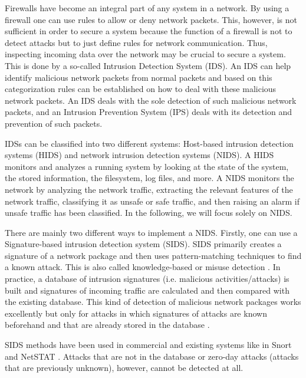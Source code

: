 \documentclass[]{article}
\begin{document}
\noindent
Firewalls have become an integral part of any system in a network. By using a firewall one can use rules to allow or deny network packets. This, however, is not sufficient in order to secure a system because the function of a firewall is not to detect attacks but to just define rules for network communication. Thus, inspecting incoming data over the network may be crucial to secure a system. This is done by a so-called Intrusion Detection System (IDS). An IDS can help identify malicious network packets from normal packets and based on this categorization rules can be established on how to deal with these malicious network packets. An IDS deals with the sole detection of such malicious network packets, and an Intrusion Prevention System (IPS) deals with its detection and prevention of such packets. 
\newline

\noindent
IDSs can be classified into two different systems: Host-based intrusion detection systems (HIDS) and network intrusion detection systems (NIDS). A HIDS monitors and analyzes a running system by looking at the state of the system, the stored information, the filesystem, log files, and more. A NIDS monitors the network by analyzing the network traffic, extracting the relevant features of the network traffic, classifying it as unsafe or safe traffic, and then raising an alarm if unsafe traffic has been classified. In the following, we will focus solely on NIDS.
\newline

\noindent
There are mainly two different ways to implement a NIDS. Firstly, one can use a Signature-based intrusion detection system (SIDS). SIDS primarily creates a signature of a network package and then uses pattern-matching techniques to find a known attack. This is also called knowledge-based or misuse detection \cite{10.1007/978-3-030-04503-6_14}. In practice, a database of intrusion signatures (i.e. malicious activities/attacks) is built and signatures of incoming traffic are calculated and then compared with the existing database. This kind of detection of malicious network packages works excellently but only for attacks in which signatures of attacks are known beforehand and that are already stored in the database \cite{10.1145/972374.972384}. 

SIDS methods have been used in commercial and existing systems like in Snort \cite{roesch1999snort} and NetSTAT \cite{vigna1999netstat}. Attacks that are not in the database or zero-day attacks (attacks that are previously unknown), however, cannot be detected at all. 
\end{document}
